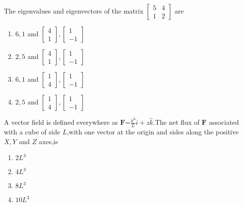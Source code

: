     \item The eigenvalues and eigenvectors of the matrix $\begin{bmatrix}5 &4 \\1&2\end{bmatrix}$ are
    \begin{enumerate}
        \item $6,1$ and $\begin{bmatrix}4\\1\end{bmatrix},\begin{bmatrix} 1\\-1
        \end{bmatrix}$
        \item $2,5$ and $\begin{bmatrix}4\\1\end{bmatrix},\begin{bmatrix} 1\\-1
        \end{bmatrix}$
        \item $6,1$ and $\begin{bmatrix}1\\4\end{bmatrix},\begin{bmatrix} 1\\-1
        \end{bmatrix}$
        \item $2,5$ and $\begin{bmatrix}1\\4\end{bmatrix},\begin{bmatrix} 1\\-1
        \end{bmatrix}$
    \end{enumerate}
    \item A vector field is defined everywhere as $\mathbf{F}$=$\frac{y^2}{L}\hat{i}+z\hat{k}$.The net flux of $\mathbf{F}$ associated with a cube of side $L$,with one vector at the origin and sides along the positive $X,Y$ and $Z$ axes,is
    \begin{enumerate}
        \item $2L^3$
        \item $4L^3$
        \item $8L^3$
        \item $10L^3$\\
    \end{enumerate}
